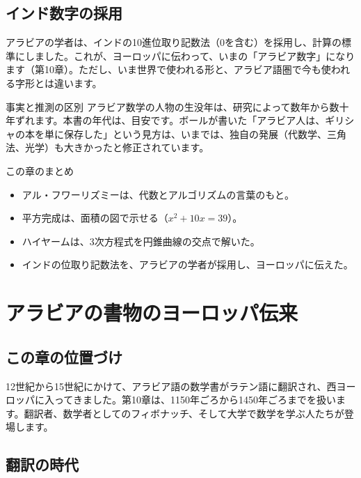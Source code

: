 \documentclass[a4paper,11pt,openany]{ltjsbook}
\begin{document}
\section{インド数字の採用}

アラビアの学者は、インドの10進位取り記数法（0を含む）を採用し、計算の標準にしました。これが、ヨーロッパに伝わって、いまの「アラビア数字」になります（第10章）。ただし、いま世界で使われる形と、アラビア語圏で今も使われる字形とは違います。

\begin{notebox}{事実と推測の区別}
アラビア数学の人物の生没年は、研究によって数年から数十年ずれます。本書の年代は、目安です。ボールが書いた「アラビア人は、ギリシャの本を単に保存した」という見方は、いまでは、独自の発展（代数学、三角法、光学）も大きかったと修正されています。
\end{notebox}

\begin{pointbox}{この章のまとめ}
\begin{itemize}[leftmargin=*]
\item アル・フワーリズミーは、代数とアルゴリズムの言葉のもと。
\item 平方完成は、面積の図で示せる（$x^2+10x=39$）。
\item ハイヤームは、3次方程式を円錐曲線の交点で解いた。
\item インドの位取り記数法を、アラビアの学者が採用し、ヨーロッパに伝えた。
\end{itemize}
\end{pointbox}

\chapter{アラビアの書物のヨーロッパ伝来}

\section{この章の位置づけ}

12世紀から15世紀にかけて、アラビア語の数学書がラテン語に翻訳され、西ヨーロッパに入ってきました。第10章は、1150年ごろから1450年ごろまでを扱います。翻訳者、数学者としてのフィボナッチ、そして大学で数学を学ぶ人たちが登場します。

\section{翻訳の時代}
\end{document}
